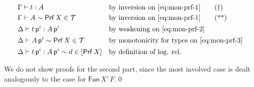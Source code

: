 \documentclass{LMCS}
\theoremstyle{plain}\newtheorem{satz}[thm]{Satz}
\newcommand{\proofLine}[2]{&#1&&\text{#2}}
\newcommand{\subsTm}[2]{#1\,#2}
\newcommand{\F}[2]{\mathsf{Fun}\,#1\,#2}
\newcommand{\p}{\mathsf{p}}
\newcommand{\dtype}[2]{#1\vdash#2}
\newcommand{\dterm}[3]{#1\vdash#3:#2}
\newcommand{\lift}[2]{\subsTm{#2}{\p^{#1}}}
\newcommand{\perT}{\mathcal{T}}
\newcommand{\rel}{\sim}
\newcommand{\prf}[1]{\mathsf{Prf}\,#1}
\begin{document}
{\begin{enumerate}
\begin{align*}
        \proofLine{\dterm{\Gamma}{A}{t}}{by inversion on
          \eqref{eq:mon-prf-1}}
        \tag{\textdagger}\label{eq:mon-prf-2}\\
        \proofLine{\dtype{\Gamma}{A}\rel \prf{X}\in \perT}{by
          inversion on \eqref{eq:mon-prf-1}}
        \tag{**}\label{eq:mon-prf-3}\\
        \proofLine{\dterm{\Delta}{\lift{i}{A}}{\lift{i}{t}}}{by weakening on \eqref{eq:mon-prf-2}}\\
        \proofLine{\dtype{\Delta}{\lift{i}{A}}\rel \prf{X}\in \perT}{by monotonicity for types on \eqref{eq:mon-prf-3}}\\
        \proofLine{\dterm{\Delta}{\lift{i}{A}}{\lift{i}{t}}\rel d\in
          [\prf{X}]}{by definition of log. rel.}
      \end{align*}
    \end{enumerate}
  We do not show proofs for the second part, since the most involved
  case is dealt analogously to the case for $\F{X'}{F}$.\qed  
}
\end{document}

